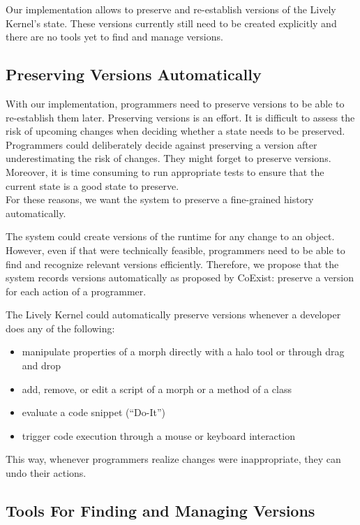 Our implementation allows to preserve and re-establish versions of the Lively Kernel's state.
These versions currently still need to be created explicitly and there are no tools yet to find and manage versions.


\subsection{Preserving Versions Automatically}

With our implementation, programmers need to preserve versions to be able to re-establish them later.
Preserving versions is an effort.
It is difficult to assess the risk of upcoming changes when deciding whether a state needs to be preserved.
Programmers could deliberately decide against preserving a version after underestimating the risk of changes.
They might forget to preserve versions.
Moreover, it is time consuming to run appropriate tests to ensure that the current state is a good state to preserve.\\
For these reasons, we want the system to preserve a fine-grained history automatically.

The system could create versions of the runtime for any change to an object.
However, even if that were technically feasible, programmers need to be able to find and recognize relevant versions efficiently.
Therefore, we propose that the system records versions automatically as proposed by CoExist: preserve a version for each action of a programmer.

The Lively Kernel could automatically preserve versions whenever a developer does any of the following:
\begin{itemize}
    \item manipulate properties of a morph directly with a halo tool or through drag and drop
    \item add, remove, or edit a script of a morph or a method of a class
    \item evaluate a code snippet (``Do-It'')
    \item trigger code execution through a mouse or keyboard interaction
\end{itemize}

This way, whenever programmers realize changes were inappropriate, they can undo their actions.


\subsection{Tools For Finding and Managing Versions}

